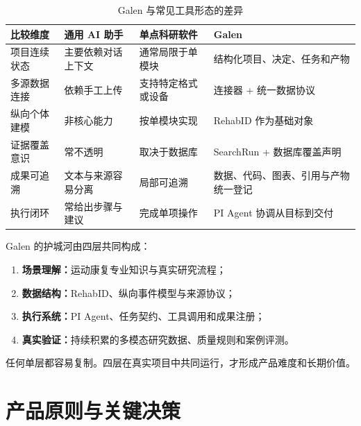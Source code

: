 \documentclass[11pt,a4paper,UTF8]{ctexart}
\begin{document}
\begin{table}[htbp]
\centering
\caption{Galen 与常见工具形态的差异}
\begin{tabularx}{\textwidth}{@{}L{3.0cm}Y Y Y@{}}
\toprule
比较维度 & 通用 AI 助手 & 单点科研软件 & Galen \\
\midrule
项目连续状态 & 主要依赖对话上下文 & 通常局限于单模块 & 结构化项目、决定、任务和产物 \\
多源数据连接 & 依赖手工上传 & 支持特定格式或设备 & 连接器 + 统一数据协议 \\
纵向个体建模 & 非核心能力 & 按单模块实现 & RehabID 作为基础对象 \\
证据覆盖意识 & 常不透明 & 取决于数据库 & SearchRun + 数据库覆盖声明 \\
成果可追溯 & 文本与来源容易分离 & 局部可追溯 & 数据、代码、图表、引用与产物统一登记 \\
执行闭环 & 常给出步骤与建议 & 完成单项操作 & PI Agent 协调从目标到交付 \\
\bottomrule
\end{tabularx}
\end{table}

Galen 的护城河由四层共同构成：

\begin{enumerate}
  \item \textbf{场景理解：}运动康复专业知识与真实研究流程；
  \item \textbf{数据结构：}RehabID、纵向事件模型与来源协议；
  \item \textbf{执行系统：}PI Agent、任务契约、工具调用和成果注册；
  \item \textbf{真实验证：}持续积累的多模态研究数据、质量规则和案例评测。
\end{enumerate}

任何单层都容易复制。四层在真实项目中共同运行，才形成产品难度和长期价值。

\section{产品原则与关键决策}
\end{document}
